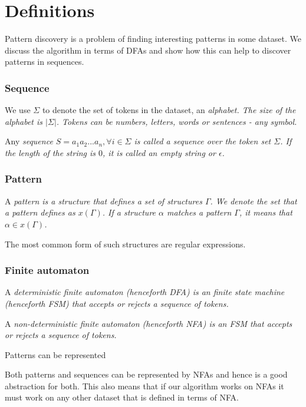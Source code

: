 \chapter{Definitions}

Pattern discovery is a problem of finding interesting patterns in
some dataset. We discuss the algorithm in terms of DFAs and
show how this can help to discover patterns in sequences.

\subsection{Sequence}

We use $\Sigma$ to denote the set of tokens in the dataset, an \em{alphabet}. 
The \em{size} of the alphabet is $|\Sigma|$. \em{Tokens} can be numbers, 
letters, words or sentences - any symbol.

Any \em{sequence} $S=a_1 a_2 ... a_n, \forall i \in \Sigma$ is called a \em{sequence} 
over the token set $\Sigma$. If the length of the
string is $0$, it is called an empty string or $\epsilon$.

\subsection{Pattern}

A \em{pattern} is a structure that defines a set of structures $\Gamma$.
We denote the set that a pattern defines as $x(\Gamma)$.
If a structure $\alpha$ \em{matches} a pattern $\Gamma$, it means that
$\alpha \in x(\Gamma)$.

The most common form of such structures are regular expressions. 

\subsection{Finite automaton}

A \em{deterministic finite automaton} (henceforth \em{DFA}) is an 
finite state machine (henceforth \em{FSM}) that accepts or rejects
a sequence of tokens.

A \em{non-deterministic finite automaton} (henceforth \em{NFA}) is an 
FSM that accepts or rejects a sequence of tokens.

Patterns can be represented 

Both patterns and sequences can be represented by NFAs and hence
is a good abstraction for both. This also means that if our algorithm
works on NFAs it must work on any other dataset that is defined in 
terms of NFA.

